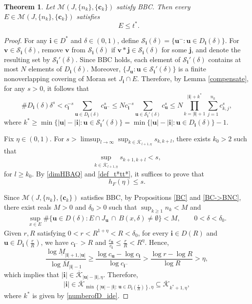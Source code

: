 \documentclass[12pt]{amsart}
\numberwithin{equation}{section}
\theoremstyle{plain}
\newtheorem{theorem}{Theorem}[section]
\theoremstyle{remark}
\theoremstyle{definition}
\newcommand{\ok}{\overline{\mathcal{K}}}
\newcommand{\om}{\overline{M}}
\newcommand{\um}{\underline{M}}
\newcommand{\iii}{\mathbf{i}}
\newcommand{\jjj}{\mathbf{j}}
\newcommand{\bu}{\mathbf{u}}
\newcommand{\bv}{\mathbf{v}}
\newcommand{\ccc}{\mathbf{c}}
\newcommand{\de}{\delta}
\newcommand{\f}{\frac}
\renewcommand{\ge}{\geqslant}
\renewcommand{\le}{\leqslant}
\renewcommand{\leq}{\leqslant}
\DeclareMathOperator{\dimqa}{dim_{qA}}
\begin{document}
	\begin{theorem}\label{xiaoyu2}
		Let $ \mathcal{M}(J,\{n_k\},\{\ccc_k\})$ satisfy BBC. Then every $E\in\mathcal{M}(J,\{n_k\},\{\ccc_k\})$ satisfies
		\[
		\dimqa E\le t^*.
		\]
	\end{theorem}
	\begin{proof}
		For any $\iii\in D^*$ and $\de\in (0,1)$, define $\mathcal{S}_\iii(\de)=\{\bu^-:\bu\in D_{\iii}(\de)\}$. For $\bv\in \mathcal{S}_\iii(\de)$, remove $\bv$ from $\mathcal{S}_\iii(\de)$ if  $\bv*\jjj\in \mathcal{S}_\iii(\de)$ for some $\jjj$, and denote the resulting set by $\mathcal{S}_\iii'(\de)$. Since BBC holds, each element of $\mathcal{S}_\iii'(\de)$ contains at most $N$ elements of $D_\iii(\de)$. Moreover, $\{J_\bu:\bu\in \mathcal{S}_\iii'(\de)\}$ is a finite nonoverlapping covering of Moran set $J_\iii\cap E$. Therefore, by Lemma \ref{compensate}, for any $s>0$, it follows that
		\begin{equation}\label{numberofD_ide}
			\# D_\iii(\de)\de^s<c_\iii^{-s}\sum_{\bu\in D_\iii(\de)}c_{\bu^-}^s\le Nc_\iii^{-s}\sum_{\bu\in \mathcal{S}_\iii'(\de)}c_{\bu}^s\le N \prod_{k=|\iii|+1}^{|\iii|+k^*}\sum_{j=1}^{n_k}c_{k,j}^s,
		\end{equation}
		where $k^*\ge \min\{|\bu|-|\iii|:\bu\in \mathcal{S}_\iii'(\de)\}=\min\{|\bu|-|\iii|:\bu \in D_\iii(\de)\}-1$.
			
Fix $\eta\in (0,1)$. For  $s>\limsup_{l\to\infty}\sup_{k\in \ok_{l+1,\eta}} s_{k,k+l}$, there exists $k_0>2$ such that
		\begin{equation}\label{K'}
			\sup_{k\in \ok_{l+1,\eta}} s_{k+1,k+l}<s,
		\end{equation}
 for $l\ge k_0$. By \eqref{dimHBAQ} and \eqref{def_t*tt*}, it suffices to prove that 
$$
h_F(\eta) \leq s. 
$$
	
Since $ \mathcal{M}(J,\{n_k\},\{\ccc_k\})$ satisfies  BBC,  by Propositions \ref{BC} and \ref{BC->BNC}, there exist reals $M>0$ and $\de_0>0$ such that $\sup_{k\ge 1} n_k<M$ and 
	\begin{gather}
		\sup_{x\in E} \#\big\{\bu\in D(\de):E\cap J_\bu\,\cap \,B(x,\de)\neq \emptyset \big\}<M,\qquad 0<\de<\de_0.\label{bnc}
	\end{gather}
		Given $r,R$ satisfying $0<r<R^{1+\eta}<R<\de_0$,  for every $\iii\in D(R)$  and $\bu\in D_\iii\left(\f rR\right)$, we have $c_{\iii^-}>R$ and $\frac{c_\bu}{c_\iii}\le \frac{r}{R}<R^\eta$. Hence,
		\[
		\f{\log \um_{|\iii|+1,|\bu|}}{\log \om_{|\iii|-1}}\ge \f{\log c_\bu-\log c_\iii}{\log c_{\iii^-}}>\frac{\log r-\log R}{\log R}>\eta,
		\]
		which implies that $|\iii|\in\ok_{|\bu|-|\iii|,\eta}$. Therefore, 
		\[
		|\iii|\in\ok_{\min\left\{|\bu|-|\iii|:\,\bu\in D_\iii(\f r R)\right\},\eta}\subseteq\ok_{k^*+1,\eta},
		\]
		where $k^*$ is given by \eqref{numberofD_ide}.
		

\end{proof}
\end{document}
